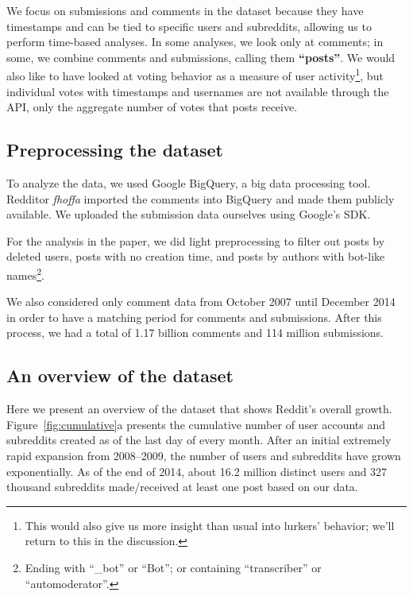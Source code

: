 We focus on submissions and comments in the dataset because they have timestamps and can be tied to specific users and subreddits, allowing us to perform time-based analyses.   In some analyses, we look only at comments; in some, we combine comments and submissions, calling them \textbf{``posts''}.  We would also like to have looked at voting behavior as a measure of user activity\footnote{This would also give us more insight than usual into lurkers' behavior; we'll return to this in the discussion.}, but individual votes with timestamps and usernames are not available through the API, only the aggregate number of votes that posts receive.

\subsection{Preprocessing the dataset}

To analyze the data, we used Google BigQuery\cite{BigQuery}, a big data processing tool.
Redditor \textit{fhoffa} imported the comments into BigQuery and made them publicly available\cite{RedditDataset2}.  We uploaded the submission data ourselves using Google's SDK.

For the analysis in the paper, we did light preprocessing to filter out posts by deleted users, posts with no creation time, and posts by authors with bot-like names\footnote{Ending with ``\_bot'' or ``Bot''; or containing ``transcriber'' or ``automoderator''.}.

We also considered only comment data from October 2007 until December 2014 in order to have a matching period for comments and submissions. After this process, we had a total of 1.17 billion comments and 114 million submissions.

\subsection{An overview of the dataset}

Here we present an overview of the dataset that shows Reddit's overall growth.  Figure~\ref{fig:cumulative}a presents the cumulative number of user accounts and subreddits created as of the last day of every month. After an initial extremely rapid expansion from 2008--2009, the number of users and subreddits have grown exponentially.  As of the end of 2014, about 16.2 million distinct users and 327 thousand subreddits made/received at least one post based on our data.

